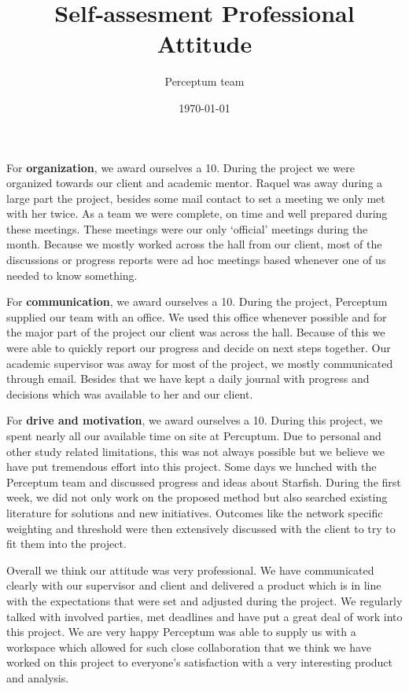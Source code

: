 \documentclass[]{article}
\begin{document}
\title{Self­‑assesment Professional Attitude}
\author{Perceptum team}
\date{\today}
\maketitle

For {\bf organization}, we award ourselves a 10. During the project we were organized towards our client and academic mentor. Raquel was away during a large part the project, besides some mail contact to set a meeting we only met with her twice. As a team we were complete,  on time and well prepared during these meetings. These meetings were our only `official' meetings during the month. Because we mostly worked across the hall from our client, most of the discussions or progress reports were ad hoc meetings based whenever one of us needed to know something.

For {\bf communication}, we award ourselves a 10. During the project, Perceptum supplied our team with an office. We used this office whenever possible and for the major part of the project our client was across the hall. Because of this we were able to quickly report our progress and decide on next steps together. Our academic supervisor was away for most of the project, we mostly communicated through email. Besides that we have kept  a daily journal with progress and decisions which was available to her and our client.

For {\bf drive and motivation}, we award ourselves a 10. During this project, we spent nearly all our available time on site at Percuptum. Due to personal and other study related limitations, this was not always possible but we believe we have put tremendous effort into this project. Some days we lunched with the Perceptum team and discussed progress and ideas about Starfish. During the first week, we did not only work on the proposed method but also searched existing literature for solutions and new initiatives. Outcomes like the network specific weighting and threshold were then extensively discussed with the client to try to fit them into the project.

Overall we think our attitude was very professional. We have communicated clearly with our supervisor and client and delivered a product which is in line with the expectations that were set and adjusted during the project. We regularly talked with involved parties, met deadlines and have put a great deal of work into this project. We are very happy Perceptum was able to supply us with a workspace which allowed for such close collaboration that we think we have worked on this project to everyone's satisfaction with a very interesting product and analysis.
\end{document}

